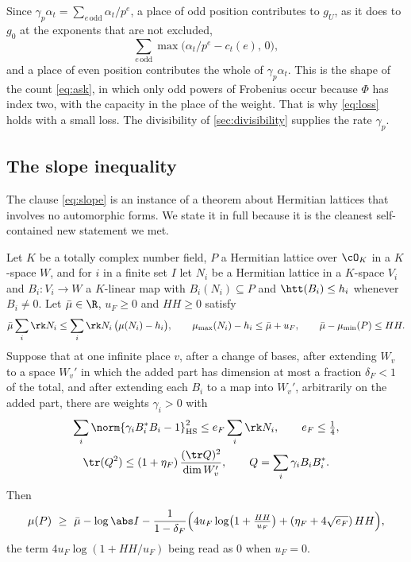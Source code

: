 Since $\gamma_p\alpha_t=\sum_{e\,\mathrm{odd}}\alpha_t/p^e$, a place of odd position
contributes to $g_U$, as it does to $g_0$ at the exponents that are not excluded,
\[
\sum_{e\,\mathrm{odd}}\max\bigl(\alpha_t/p^e-c_t(e),\,0\bigr),
\]
and a place of even position contributes the whole of $\gamma_p\alpha_t$. This
is the shape of the count \eqref{eq:ask}, in which only odd powers of Frobenius occur because
$\Phi$ has index two, with the capacity in the place of the weight. That is why
\eqref{eq:loss} holds with a small loss. The divisibility of \cref{sec:divisibility} supplies
the rate $\gamma_p$.

\subsection{The slope inequality}\label{sec:slope}
The clause \eqref{eq:slope} is an instance of a theorem about Hermitian lattices that involves
no automorphic forms. We state it in full because it is the cleanest self-contained new
statement we met.

\begin{statement}\label{st:F}
Let $K$ be a totally complex number field, $P$ a Hermitian lattice over $\cO_K$ in a $K$-space
$W$, and for $i$ in a finite set $I$ let $N_i$ be a Hermitian lattice in a $K$-space $V_i$ and
$B_i\colon V_i\to W$ a $K$-linear map with $B_i(N_i)\subseteq P$ and $\htt(B_i)\le h_i$ whenever
$B_i\ne0$. Let $\bar\mu\in\R$, $u_F\ge0$ and $HH\ge0$ satisfy
\[
\bar\mu\sum_i\rk N_i\le\sum_i\rk N_i\,\bigl(\mu(N_i)-h_i\bigr),\qquad
\mu_{\max}(N_i)-h_i\le\bar\mu+u_F,\qquad \bar\mu-\mu_{\min}(P)\le HH .
\]
Suppose that at one infinite place $v$, after a change of bases, after extending $W_v$ to a
space $W_v'$ in which the added part has dimension at most a fraction $\delta_F<1$ of the
total, and after extending each $B_i$ to a map into $W_v'$, arbitrarily on the added part,
there are weights $\gamma_i>0$
with
\begin{gather*}
\sum_i\norm{\gamma_iB_i^*B_i-1}_{\mathrm{HS}}^2\le e_F\sum_i\rk N_i,\qquad e_F\le\tfrac14,\\
\tr(Q^2)\le(1+\eta_F)\,\frac{(\tr Q)^2}{\dim W_v'},\qquad Q=\sum_i\gamma_iB_iB_i^* .
\end{gather*}
Then
\[
\mu(P)\ \ge\ \bar\mu-\log\abs I-\frac1{1-\delta_F}\Bigl(4u_F\log\bigl(1+\tfrac{HH}{u_F}\bigr)+(\eta_F+4\sqrt{e_F})\,HH\Bigr),
\]
the term $4u_F\log(1+HH/u_F)$ being read as $0$ when $u_F=0$.
\end{statement}

